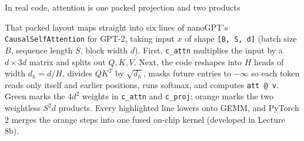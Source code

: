 \documentclass[aspectratio=169, 12pt]{beamer}
\begin{document}
\begin{frame}[fragile]{In real code, attention is one packed projection and two products}
{    That packed layout maps straight into six lines of nanoGPT's \texttt{CausalSelfAttention} for GPT-2, taking input $x$ of shape \texttt{[B, S, d]} (batch size $B$, sequence length $S$, block width $d$). First, \texttt{c\_attn} multiplies the input by a $d \times 3d$ matrix and splits out $Q, K, V$. Next, the code reshapes into $H$ heads of width $d_h = d / H$, divides $Q K^T$ by $\sqrt{d_h}$, masks future entries to $-\infty$ so each token reads only itself and earlier positions, runs softmax, and computes \texttt{att @ v}. Green marks the $4 d^2$ weights in \texttt{c\_attn} and \texttt{c\_proj}; orange marks the two weightless $S^2 d$ products. Every highlighted line lowers onto GEMM, and PyTorch 2 merges the orange steps into one fused on-chip kernel (developed in Lecture 8b).



  }
\end{frame}
\end{document}
